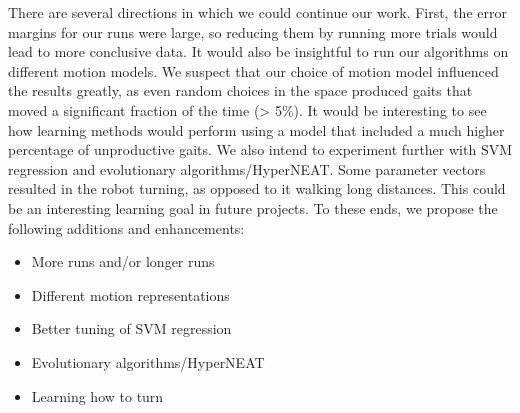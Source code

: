 


There are several directions in which we could continue our
work. First, the error margins for our runs were large, so reducing
them by running more trials would lead to more conclusive data. It
would also be insightful to run our algorithms on different motion
models.  We suspect that our choice of motion model influenced the
results greatly, as even random choices in the space produced gaits
that moved a significant fraction of the time (> 5\%).  It would be
interesting to see how learning methods would perform using a model
that included a much higher percentage of unproductive gaits. We also
intend to experiment further with SVM regression and evolutionary
algorithms/HyperNEAT.  Some parameter vectors resulted in the robot
turning, as opposed to it walking long distances. This could be an
interesting learning goal in future projects. To these ends, we
propose the following additions and enhancements:

\begin{itemize}
\item More runs and/or longer runs
\item Different motion representations
\item Better tuning of SVM regression
\item Evolutionary algorithms/HyperNEAT\cite{clune}
\item Learning how to turn
\end{itemize}
